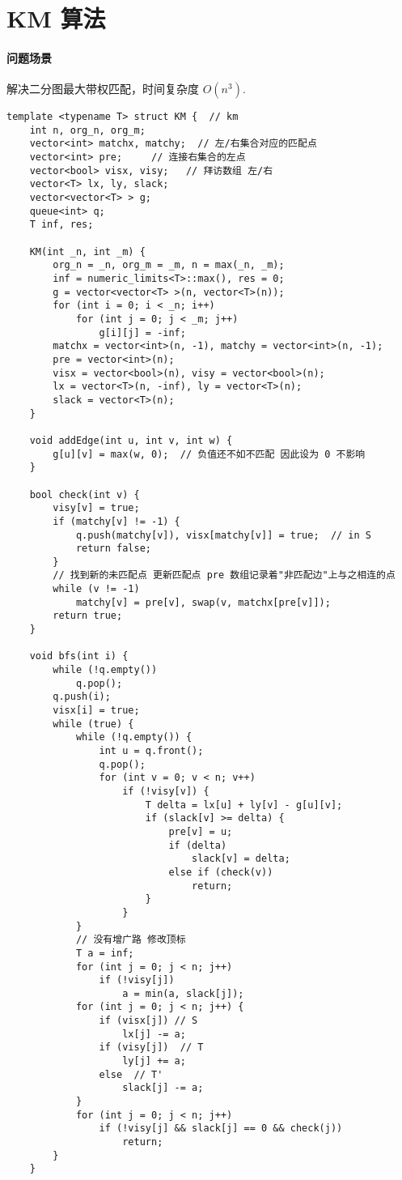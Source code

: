 \section{KM 算法}
\paragraph{问题场景} 解决二分图最大带权匹配，时间复杂度 $O(n^3)$.

\begin{verbatim}
template <typename T> struct KM {  // km
    int n, org_n, org_m;
    vector<int> matchx, matchy;  // 左/右集合对应的匹配点
    vector<int> pre;     // 连接右集合的左点
    vector<bool> visx, visy;   // 拜访数组 左/右
    vector<T> lx, ly, slack;
    vector<vector<T> > g;
    queue<int> q;
    T inf, res;

    KM(int _n, int _m) {
        org_n = _n, org_m = _m, n = max(_n, _m);
        inf = numeric_limits<T>::max(), res = 0;
        g = vector<vector<T> >(n, vector<T>(n));
        for (int i = 0; i < _n; i++)
            for (int j = 0; j < _m; j++)
                g[i][j] = -inf;
        matchx = vector<int>(n, -1), matchy = vector<int>(n, -1);
        pre = vector<int>(n);
        visx = vector<bool>(n), visy = vector<bool>(n);
        lx = vector<T>(n, -inf), ly = vector<T>(n);
        slack = vector<T>(n);
    }

    void addEdge(int u, int v, int w) {
        g[u][v] = max(w, 0);  // 负值还不如不匹配 因此设为 0 不影响
    }

    bool check(int v) {
        visy[v] = true;
        if (matchy[v] != -1) {
            q.push(matchy[v]), visx[matchy[v]] = true;  // in S
            return false;
        }
        // 找到新的未匹配点 更新匹配点 pre 数组记录着"非匹配边"上与之相连的点
        while (v != -1)
            matchy[v] = pre[v], swap(v, matchx[pre[v]]);
        return true;
    }

    void bfs(int i) {
        while (!q.empty())
            q.pop();
        q.push(i);
        visx[i] = true;
        while (true) {
            while (!q.empty()) {
                int u = q.front();
                q.pop();
                for (int v = 0; v < n; v++)
                    if (!visy[v]) {
                        T delta = lx[u] + ly[v] - g[u][v];
                        if (slack[v] >= delta) {
                            pre[v] = u;
                            if (delta)
                                slack[v] = delta;
                            else if (check(v))
                                return;
                        }
                    }
            }
            // 没有增广路 修改顶标
            T a = inf;
            for (int j = 0; j < n; j++)
                if (!visy[j])
                    a = min(a, slack[j]);
            for (int j = 0; j < n; j++) {
                if (visx[j]) // S
                    lx[j] -= a;
                if (visy[j])  // T
                    ly[j] += a;
                else  // T'
                    slack[j] -= a;
            }
            for (int j = 0; j < n; j++)
                if (!visy[j] && slack[j] == 0 && check(j))
                    return;
        }
    }


\end{verbatim}
